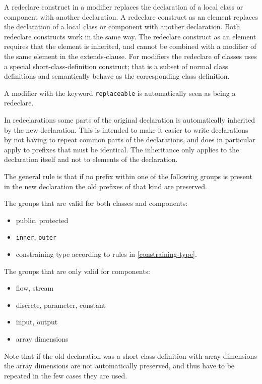 A redeclare construct in a modifier replaces the declaration of a local
class or component with another declaration. A redeclare construct as an
element replaces the declaration of a local class or component with
another declaration. Both redeclare constructs work in the same way. The
redeclare construct as an element requires that the element is
inherited, and cannot be combined with a modifier of the same element in
the extends-clause. For modifiers the redeclare of classes uses a
special short-class-definition construct; that is a subset of normal
class definitions and semantically behave as the corresponding
class-definition.

A modifier with the keyword \lstinline[basicstyle=\ttfamily]!replaceable! is automatically seen as being a
redeclare.

In redeclarations some parts of the original declaration is
automatically inherited by the new declaration. This is intended to make
it easier to write declarations by not having to repeat common parts of
the declarations, and does in particular apply to prefixes that must be
identical. The inheritance only applies to the declaration itself and
not to elements of the declaration.

The general rule is that if no prefix within one of the following groups
is present in the new declaration the old prefixes of that kind are
preserved.

The groups that are valid for both classes and components:

\begin{itemize}
\item
  public, protected
\item
  \lstinline[basicstyle=\ttfamily]!inner!, \lstinline[basicstyle=\ttfamily]!outer!
\item
  constraining type according to rules in \autoref{constraining-type}.
\end{itemize}

The groups that are only valid for components:

\begin{itemize}
\item
  flow, stream
\item
  discrete, parameter, constant
\item
  input, output
\item
  array dimensions
\end{itemize}

Note that if the old declaration was a short class definition with array
dimensions the array dimensions are not automatically preserved, and
thus have to be repeated in the few cases they are used.

